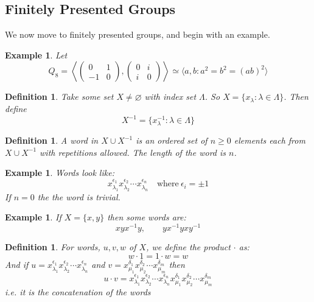 \documentclass[a4paper,10pt]{article}
\newtheorem{Def}[thm]{Definition}
\newtheorem{eg}[thm]{Example}
\begin{document}
\subsection{Finitely Presented Groups}
We now move to finitely presented groups, and begin with an example.
\begin{eg}
Let 
\[ Q_8 = \left\langle \begin{pmatrix} 0 & 1 \\ -1 & 0 \end{pmatrix} , \begin{pmatrix} 0 & i \\ i & 0 \end{pmatrix} \right\rangle \simeq \langle a, b : a^2 = b^2 = (ab)^2 \rangle \]
\end{eg}

\begin{Def}
Take some set $X \neq \varnothing$ with index set $\Lambda$. So $X = \{ x_\lambda : \lambda \in \Lambda \}$. Then define
\[ X^{-1} = \{ x_\lambda^{-1} : \lambda \in \Lambda \} \] 
\end{Def}

\begin{Def}
A word in $X \cup X^{-1}$ is an ordered set of $n\geq 0$ elements each from $X \cup X^{-1}$ with repetitions allowed. The length of the word is $n$.
\end{Def}

\begin{eg}
Words look like:
\[ x_{\lambda_1}^{\epsilon_1} x_{\lambda_2}^{\epsilon_2} \cdots x_{\lambda_n}^{\epsilon_n} \quad \text{where} \ \epsilon_i = \pm 1 \]
If $n = 0$ the the word is trivial. 
\end{eg}

\begin{eg}
If $X = \{ x , y\}$ then some words are:
\[ xyx^{-1}y, \qquad yx^{-1}yxy^{-1} \]
\end{eg}

\begin{Def}
For words, $u,v,w$ of $X$, we define the product $\cdot$ as:
\[ w \cdot 1 = 1 \cdot w =  w\]
And if $u = x_{\lambda_1}^{\epsilon_1} x_{\lambda_2}^{\epsilon_2} \cdots x_{\lambda_n}^{\epsilon_n}$ and $v = x_{\mu_1}^{\delta_1} x_{\mu_2}^{\delta_2} \cdots x_{\mu_m}^{\delta_m}$ then
\[ u \cdot v =  x_{\lambda_1}^{\epsilon_1} x_{\lambda_2}^{\epsilon_2} \cdots x_{\lambda_n}^{\epsilon_n} x_{\mu_1}^{\delta_1} x_{\mu_2}^{\delta_2} \cdots x_{\mu_m}^{\delta_m} \]
i.e. it is the concatenation of the words
\end{Def}
\end{document}
